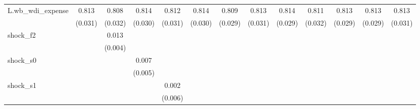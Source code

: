 {\begin{tabular}{l*{12}{c}}
\addlinespace
L.wb\_wdi\_expense&       0.813\sym{***}&       0.808\sym{***}&       0.814\sym{***}&       0.812\sym{***}&       0.814\sym{***}&       0.809\sym{***}&       0.813\sym{***}&       0.814\sym{***}&       0.811\sym{***}&       0.813\sym{***}&       0.813\sym{***}&       0.813\sym{***}\\
            &     (0.031)         &     (0.032)         &     (0.030)         &     (0.031)         &     (0.030)         &     (0.029)         &     (0.031)         &     (0.029)         &     (0.032)         &     (0.029)         &     (0.029)         &     (0.031)         \\
\addlinespace
shock\_f2    &                     &       0.013\sym{***}&                     &                     &                     &                     &                     &                     &                     &                     &                     &                     \\
            &                     &     (0.004)         &                     &                     &                     &                     &                     &                     &                     &                     &                     &                     \\
\addlinespace
shock\_s0    &                     &                     &       0.007         &                     &                     &                     &                     &                     &                     &                     &                     &                     \\
            &                     &                     &     (0.005)         &                     &                     &                     &                     &                     &                     &                     &                     &                     \\
\addlinespace
shock\_s1    &                     &                     &                     &       0.002         &                     &                     &                     &                     &                     &                     &                     &                     \\
            &                     &                     &                     &     (0.006)         &                     &                     &                     &                     &                     &                     &                     &                     \\

\end{tabular}}
